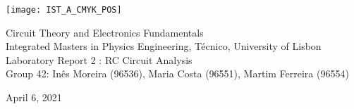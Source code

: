 
\thispagestyle {empty}

\texttt{[image: IST\_A\_CMYK\_POS]}

\begin{center}
%
\vspace{1.0cm}

\vspace{1cm}
{\FontLb Circuit Theory and Electronics Fundamentals} \\ %
\vspace{1cm}
{\FontSn Integrated Masters in Physics Engineering, Técnico, University of Lisbon} \\ %
\vspace{1cm}
{\FontSn Laboratory Report 2 : RC Circuit Analysis} \\
\vspace{1cm}
{\FontSn Group 42: Inês Moreira (96536), Maria Costa (96551), Martim Ferreira (96554)}
\vspace{1cm}
\par
{\FontSn April 6, 2021} \\ %
\vspace{1cm}
%
\end{center}

